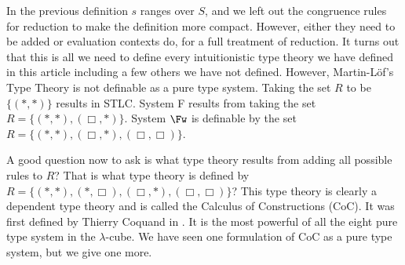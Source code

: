 In the previous definition $s$ ranges over $S$, and we left out the
congruence rules for reduction to make the definition more compact.
However, either they need to be added or evaluation contexts do, for a
full treatment of reduction.  It turns out that this is all we need to
define every intuitionistic type theory we have defined in this
article including a few others we have not defined. However,
Martin-L\"of's Type Theory is not definable as a pure type system.
Taking the set $R$ to be $\{ (*,*) \}$ results in STLC.  System F
results from taking the set $R = \{ (*,*),(\Box,*) \}$. System $\Fw$
is definable by the set $R = \{(*,*),(\Box,*),(\Box,\Box)\}$.

A good question now to ask is what type theory results from adding all
possible rules to $R$?  That is what type theory is defined by $R = \{(*,*), (*, \Box), (\Box,*), (\Box,\Box)\}$?  This type theory is
clearly a dependent type theory and is called the Calculus of
Constructions (CoC).  It was first defined by Thierry Coquand in
\cite{Coquand:1988}.  It is the most powerful of all the eight pure type
system in the $\lambda$-cube.  We have seen one formulation of CoC as
a pure type system, but we give one more.  

